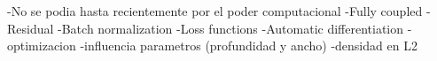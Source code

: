 \label{chp:ApendixNN}
-No se podia hasta recientemente por el poder computacional
-Fully coupled
-Residual
-Batch normalization
-Loss functions
-Automatic differentiation
-optimizacion
-influencia parametros (profundidad y ancho)
-densidad en L2
